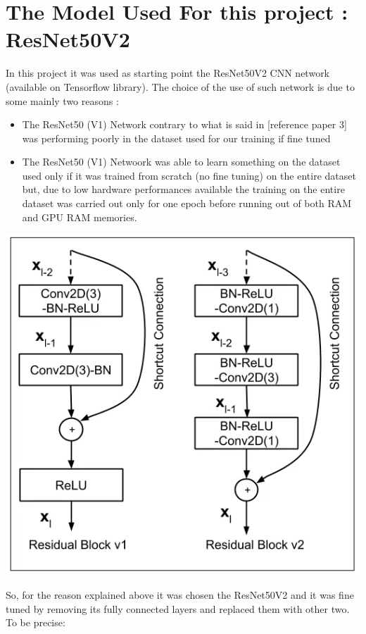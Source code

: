 \section{The Model Used For this project : ResNet50V2}

\begin{flushleft}

In this project it was used as starting point the ResNet50V2 CNN network (available on Tensorflow library). The choice of the use of such network is due to some mainly two reasons :
\begin{itemize}
    \item The ResNet50 (V1) Network contrary to what is said in [reference paper 3] was performing poorly in the dataset used for our training if fine tuned
    \item The ResNet50 (V1) Netwoork was able to learn something on the dataset used only if it was trained from scratch (no fine tuning) on the entire dataset but, due to low hardware performances available the training on the entire dataset was carried out only for one epoch before running out of both RAM and GPU RAM memories.
\end{itemize}
\begin{center}
\includegraphics[scale = 0.35]{images/RenetVersus.PNG}    
\end{center}
So, for the reason explained above it was chosen the ResNet50V2 and it was fine tuned by removing its fully connected layers and replaced them with other two. To be precise:

\end{flushleft}
